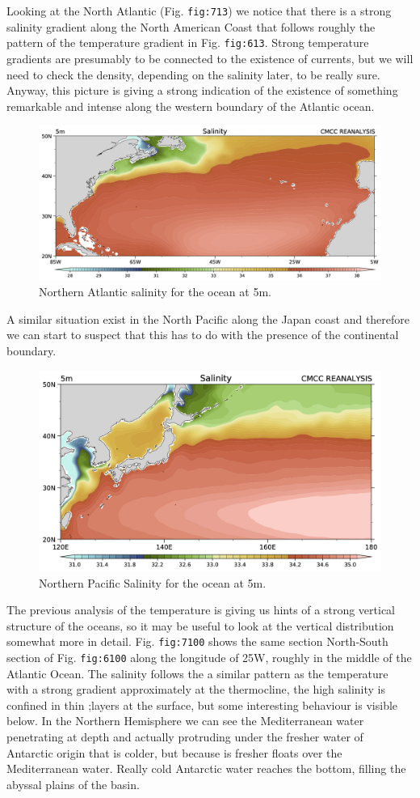 Looking at the North Atlantic (Fig. \texttt{fig:713}) we notice that
there is a strong salinity gradient along the North American Coast that
follows roughly the pattern of the temperature gradient in Fig.
\texttt{fig:613}. Strong temperature gradients are presumably to be
connected to the existence of currents, but we will need to check the
density, depending on the salinity later, to be really sure. Anyway,
this picture is giving a strong indication of the existence of something
remarkable and intense along the western boundary of the Atlantic ocean.

\begin{figure}
\centering
\includegraphics[width = .7 \textwidth]{figs/GD/SGulf5.png}
\caption{Northern Atlantic salinity for the ocean at 5m.}
\end{figure}

A similar situation exist in the North Pacific along the Japan coast and
therefore we can start to suspect that this has to do with the presence
of the continental boundary.

\begin{figure}
\centering
\includegraphics[width = .7 \textwidth]{figs/GD/SKur5.png}
\caption{Northern Pacific Salinity for the ocean at 5m.}
\end{figure}

The previous analysis of the temperature is giving us hints of a strong
vertical structure of the oceans, so it may be useful to look at the
vertical distribution somewhat more in detail. Fig. \texttt{fig:7100}
shows the same section North-South section of Fig. \texttt{fig:6100}
along the longitude of 25W, roughly in the middle of the Atlantic Ocean.
The salinity follows the a similar pattern as the temperature with a
strong gradient approximately at the thermocline, the high salinity is
confined in thin ;layers at the surface, but some interesting behaviour
is visible below. In the Northern Hemisphere we can see the
Mediterranean water penetrating at depth and actually protruding under
the fresher water of Antarctic origin that is colder, but because is
fresher floats over the Mediterranean water. Really cold Antarctic water
reaches the bottom, filling the abyssal plains of the basin.

